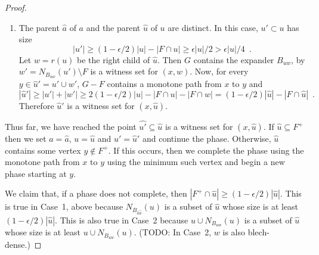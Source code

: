 \documentclass{patmorin}
\begin{document}
\begin{proof}
\begin{enumerate}
    \item The parent $\hat{a}$ of $a$ and the parent $\hat{u}$ of $u$ are distinct.  In this case, $u'\subset u$ has size
    \[  |u'| \ge (1-\epsilon/2)|u|-|F\cap u| \ge \epsilon|u|/2 > \epsilon|u|/4 \enspace .\]
		  Let $w=r(u)$ be the right child of $\hat{u}$.  Then $G$ contains the expander $B_{uw}$, by  $w'=N_{B_{uw}}(u')\setminus F$
		  is a witness set for $(x,w)$. 
		   Now, for every $y\in \hat{u}'=u'\cup w'$, $G-F$ contains a monotone path from $x$ to $y$ and 
		  \[ |\hat{u}'| \ge |u'|+|w'| \ge 2(1-\epsilon/2)|u| - |F\cap u| - |F\cap w| = (1-\epsilon/2)|\hat{u}| - |F\cap \hat{u}|  \enspace .
	    \]
		  Therefore $\hat{u}'$ is a witness set for $(x,\hat{u})$.
  \end{enumerate}

  Thus far, we have reached the point $\hat{u'}\subseteq \hat{u}$ is a
  witness set for $(x,\hat{u})$.  If $\hat{u}\subseteq F^+$ then we set
  $a=\hat{a}$, $u=\hat{u}$ and $u'=\hat{u}'$ and continue the phase.
  Otherwise, $\hat{u}$ contains some vertex $y\not\in F^+$.  If this
  occurs, then we complete the phase using the monotone path from $x$
  to $y$ using the minimum such vertex and begin a new phase starting at $y$.

  We claim that, if a phase does not complete, then $|F^+\cap\hat{u}|
  \ge (1-\epsilon/2)|\hat{u}|$. This is true in Case~1, above because
  $N_{B_{\hat{a}\hat{u}}}(u)$ is a subset of $\hat{u}$ whose size is at
  least $(1-\epsilon/2)|\hat{u}|$.  This is also true in Case~2 because
  $u\cup N_{B_{uw}}(u)$ is a subset of $\hat{u}$ whose size is at least
	$u\cup N_{B_{uw}}(u)$. (TODO: In Case~2, $w$ is also blech-dense.)


\end{proof}
\end{document}
